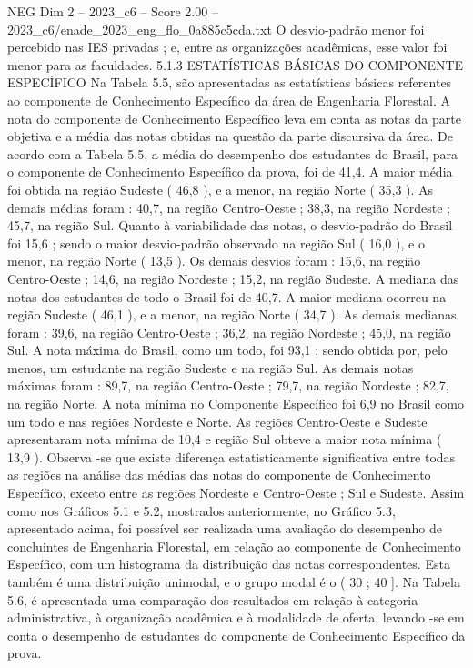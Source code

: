 \begin{textsample}{NEG Dim 2 – 2023\_c6 – Score 2.00 – 2023\_c6/enade\_2023\_eng\_flo\_0a885c5cda.txt}
O desvio-padrão menor foi percebido nas IES privadas ; e, entre as organizações acadêmicas, esse valor foi menor para as faculdades. 5.1.3 ESTATÍSTICAS BÁSICAS DO COMPONENTE ESPECÍFICO Na Tabela 5.5, são apresentadas as estatísticas básicas referentes ao componente de Conhecimento Específico da área de Engenharia Florestal.
A nota do componente de Conhecimento Específico leva em conta as notas da parte objetiva e a média das notas obtidas na questão da parte discursiva da área.
De acordo com a Tabela 5.5, a média do desempenho dos estudantes do Brasil, para o componente de Conhecimento Específico da prova, foi de 41,4.
A maior média foi obtida na região Sudeste ( 46,8 ), e a menor, na região Norte ( 35,3 ).
As demais médias foram : 40,7, na região Centro-Oeste ; 38,3, na região Nordeste ; 45,7, na região Sul.
Quanto à variabilidade das notas, o desvio-padrão do Brasil foi 15,6 ; sendo o maior desvio-padrão observado na região Sul ( 16,0 ), e o menor, na região Norte ( 13,5 ).
Os demais desvios foram : 15,6, na região Centro-Oeste ; 14,6, na região Nordeste ; 15,2, na região Sudeste.
A mediana das notas dos estudantes de todo o Brasil foi de 40,7.
A maior mediana ocorreu na região Sudeste ( 46,1 ), e a menor, na região Norte ( 34,7 ).
As demais medianas foram : 39,6, na região Centro-Oeste ; 36,2, na região Nordeste ; 45,0, na região Sul.
A nota máxima do Brasil, como um todo, foi 93,1 ; sendo obtida por, pelo menos, um estudante na região Sudeste e na região Sul.
As demais notas máximas foram : 89,7, na região Centro-Oeste ; 79,7, na região Nordeste ; 82,7, na região Norte.
A nota mínima no Componente Específico foi 6,9 no Brasil como um todo e nas regiões Nordeste e Norte.
As regiões Centro-Oeste e Sudeste apresentaram nota mínima de 10,4 e região Sul obteve a maior nota mínima ( 13,9 ).
Observa -se que existe diferença estatisticamente significativa entre todas as regiões na análise das médias das notas do componente de Conhecimento Específico, exceto entre as regiões Nordeste e Centro-Oeste ; Sul e Sudeste.
Assim como nos Gráficos 5.1 e 5.2, mostrados anteriormente, no Gráfico 5.3, apresentado acima, foi possível ser realizada uma avaliação do desempenho de concluintes de Engenharia Florestal, em relação ao componente de Conhecimento Específico, com um histograma da distribuição das notas correspondentes.
Esta também é uma distribuição unimodal, e o grupo modal é o ( 30 ; 40 ].
Na Tabela 5.6, é apresentada uma comparação dos resultados em relação à categoria administrativa, à organização acadêmica e à modalidade de oferta, levando -se em conta o desempenho de estudantes do componente de Conhecimento Específico da prova.

\end{textsample}
